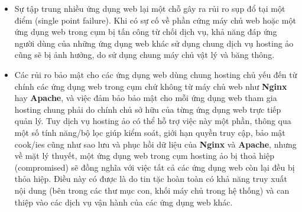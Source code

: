 \begin{itemize}
    \item Sự tập trung nhiều ứng dụng web lại một chỗ gây ra rủi ro sụp đổ tại một điểm (single point failure). Khi có sự cố về phần cứng máy chủ web hoặc một ứng dụng web trong cụm bị tấn công từ chối dịch vụ, khả năng đáp ứng người dùng của những ứng dụng web khác sử dụng chung dịch vụ hosting ảo cũng sẽ bị ảnh hưởng, do sử dụng chung máy chủ vật lý và băng thông. 
    \item Các rủi ro bảo mật cho các ứng dụng web dùng chung hosting chủ yếu đến từ chính các ứng dụng web trong cụm chứ không từ máy chủ web như \textbf{Nginx} hay \textbf{Apache}, và việc đảm bảo bảo mật cho mỗi ứng dụng web tham gia hosting chung phải do chính chủ sở hữu của từng ứng dụng web trực tiếp quản lý. Tuy dịch vụ hosting ảo có thể hỗ trợ việc này một phần, thông qua một số tính năng/bộ lọc giúp kiểm soát, giới hạn quyền truy cập, bảo mật cook/ies cũng như sao lưu và phục hồi dữ liệu của \textbf{Nginx} và \textbf{Apache}, nhưng về mặt lý thuyết, một ứng dụng web trong cụm hosting ảo bị thoả hiệp (compromised) sẽ đồng nghĩa với việc tất cả các ứng dụng web còn lại đều bị thỏa hiệp. Điều này có được là do tin tặc hoàn toàn có khả năng truy xuất nội dung (bên trong các thư mục con, khối máy chủ trong hệ thống) và can thiệp vào các dịch vụ vận hành của các ứng dụng web khác.
\end{itemize}
